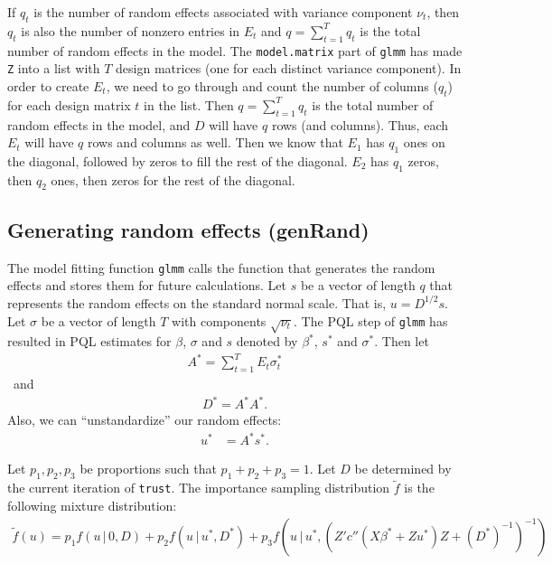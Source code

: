 \documentclass{article}
\begin{document}
If $q_t$ is the number of random effects associated with variance component $\nu_t$, then $q_t$ is also the number of nonzero entries in $E_t$ and $q=\sum_{t=1}^T q_t$ is the total number of random effects in the model.  
The \texttt{model.matrix} part of \texttt{glmm} has made  \texttt{Z} into a list with $T$ design matrices (one for each distinct variance component).  In order to create $E_t$, we need to go through and count the  number of columns ($q_t$) for each design matrix $t$ in the list.
 Then $q=\sum_{t=1}^T q_t$ is the total number of random effects in the model, and $D$ will have $q$ rows (and columns). Thus, each $E_t$ will have $q$ rows and columns as well.  Then we know that $E_1$ has $q_1$ ones on the diagonal, followed by zeros to fill the rest of the diagonal.  $E_2$ has $q_1$ zeros, then $q_2$ ones, then zeros for the rest of the diagonal.



\subsection{Generating random effects (genRand)}\label{sec:genRand}
The model fitting function \texttt{glmm}  calls the function that generates the random effects and  stores them for future calculations. Let $s$ be a vector of length $q$ that represents the random effects on the standard normal scale. That is, $u= D^{1/2}s$. Let $\sigma$ be a vector of length $T$ with components $\sqrt{\nu_t}$.  The  PQL step of \texttt{glmm} has resulted in PQL estimates for $\beta$, $\sigma$ and  $s$ denoted by $\beta^*$, $s^*$ and $\sigma^*$. Then let
\begin{align}
A^*=\sum_{t=1}^T E_t \sigma^*_t
\end{align}\
and
\begin{align}
 D^* =A^*A^*.
\end{align}
Also, we can ``unstandardize'' our random effects:
\begin{align}
u^*&=A^*s^*.
\end{align}

Let $p_1,p_2,p_3$ be proportions such that  $p_1+p_2+p_3=1$. Let $D$ be determined by the current iteration of \texttt{trust}. The importance sampling distribution $\tilde{f}$ is the following mixture distribution:
\begin{align}
 \tilde{f}(u) = p_1  f(u \, | \, 0, D)+p_2  f(u \, | \, u^*, D^*)+p_3  f(u \, | \, u^*, (Z'  c''(X \beta^*+Zu^*) Z +(D^*)^{-1}   )^{-1})
\end{align}
\end{document}
